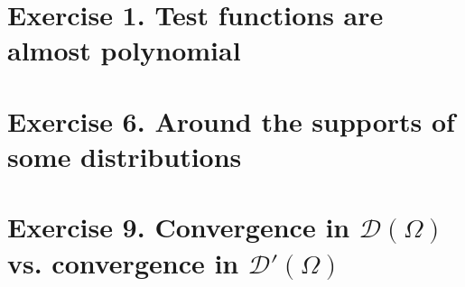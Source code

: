 %
\section{Exercise 1. Test functions are almost polynomial}


\setcounter{section}{5} 
\section{Exercise 6. Around the supports of some distributions}

\setcounter{section}{8} 
\section{Exercise 9. Convergence in $\mathscr{D}(\Omega)\,$ vs. convergence in $\mathscr{D}'(\Omega)\,$}

%

